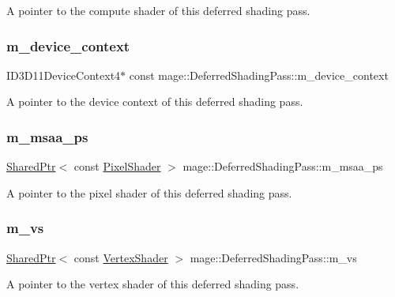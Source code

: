 A pointer to the compute shader of this deferred shading pass. \hypertarget{classmage_1_1_deferred_shading_pass_a05b1c649f39f267ce5a5cecdd02b8ffb}{}\label{classmage_1_1_deferred_shading_pass_a05b1c649f39f267ce5a5cecdd02b8ffb} 
\subsubsection{\texorpdfstring{m\+\_\+device\+\_\+context}{m\_device\_context}}
{\footnotesize\ttfamily I\+D3\+D11\+Device\+Context4$\ast$ const mage\+::\+Deferred\+Shading\+Pass\+::m\+\_\+device\+\_\+context\hspace{0.3cm}{\ttfamily [private]}}

A pointer to the device context of this deferred shading pass. \hypertarget{classmage_1_1_deferred_shading_pass_a2da9b0462428d209f3b546a934962a77}{}\label{classmage_1_1_deferred_shading_pass_a2da9b0462428d209f3b546a934962a77} 
\subsubsection{\texorpdfstring{m\+\_\+msaa\+\_\+ps}{m\_msaa\_ps}}
{\footnotesize\ttfamily \hyperlink{namespacemage_a1e01ae66713838a7a67d30e44c67703e}{Shared\+Ptr}$<$ const \hyperlink{namespacemage_a27ecaf266420ee7a494d64edc0757129}{Pixel\+Shader} $>$ mage\+::\+Deferred\+Shading\+Pass\+::m\+\_\+msaa\+\_\+ps\hspace{0.3cm}{\ttfamily [private]}}

A pointer to the pixel shader of this deferred shading pass. \hypertarget{classmage_1_1_deferred_shading_pass_a0bf671a656df1931dc99abc636abecd1}{}\label{classmage_1_1_deferred_shading_pass_a0bf671a656df1931dc99abc636abecd1} 
\subsubsection{\texorpdfstring{m\+\_\+vs}{m\_vs}}
{\footnotesize\ttfamily \hyperlink{namespacemage_a1e01ae66713838a7a67d30e44c67703e}{Shared\+Ptr}$<$ const \hyperlink{classmage_1_1_vertex_shader}{Vertex\+Shader} $>$ mage\+::\+Deferred\+Shading\+Pass\+::m\+\_\+vs\hspace{0.3cm}{\ttfamily [private]}}

A pointer to the vertex shader of this deferred shading pass. 